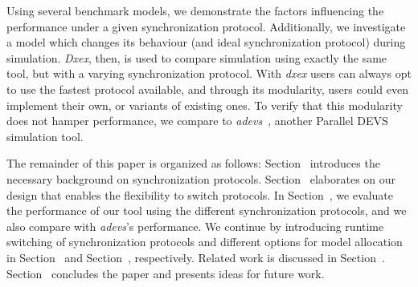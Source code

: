 Using several benchmark models, we demonstrate the factors influencing the performance under a given synchronization protocol.
Additionally, we investigate a model which changes its behaviour (and ideal synchronization protocol) during simulation.
\textit{Dxex}, then, is used to compare simulation using exactly the same tool, but with a varying synchronization protocol.
With \textit{dxex} users can always opt to use the fastest protocol available, and through its modularity, users could even implement their own, or variants of existing ones.
To verify that this modularity does not hamper performance, we compare to \textit{adevs}~\cite{adevs}, another \textsf{Parallel DEVS} simulation tool.

The remainder of this paper is organized as follows:
Section~\textsc{} introduces the necessary background on synchronization protocols.
Section~\textsc{} elaborates on our design that enables the flexibility to switch protocols.
In Section~\textsc{}, we evaluate the performance of our tool using the different synchronization protocols, and we also compare with \textit{adevs}'s performance.
We continue by introducing runtime switching of synchronization protocols and different options for model allocation in Section~\textsc{} and Section~\textsc{}, respectively.
Related work is discussed in Section~\textsc{}.
Section~\textsc{} concludes the paper and presents ideas for future work.
